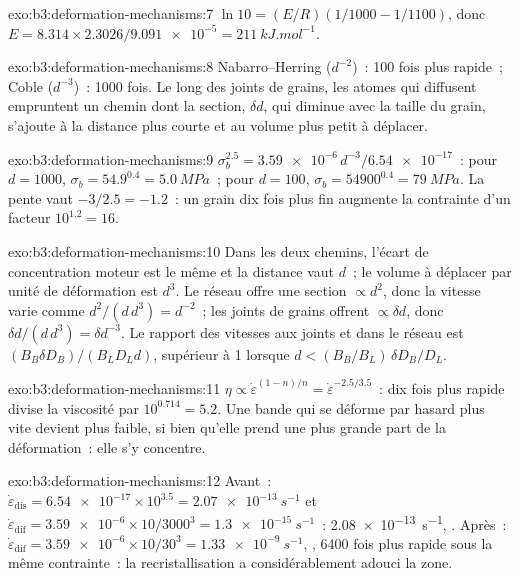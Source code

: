 \begin{solution}{exo:b3:deformation-mechanisms:7}
$\ln10 = (E/R)(1/1000 - 1/1100)$, donc $E = 8.314\times2.3026/\num{9.091e-5} =
\qty{211}{kJ.mol^{-1}}$.
\end{solution}

\begin{solution}{exo:b3:deformation-mechanisms:8}
Nabarro--Herring ($d^{-2}$)~: 100 fois plus rapide~; Coble ($d^{-3}$)~: 1000 fois.
Le long des joints de grains, les atomes qui diffusent empruntent un chemin dont la section, $\delta
d$, qui diminue avec la taille du grain, s'ajoute à la distance plus courte et au
volume plus petit à déplacer.
\end{solution}

\begin{solution}{exo:b3:deformation-mechanisms:9}
$\sigma_b^{2.5} = \num{3.59e-6}\,d^{-3}/\num{6.54e-17}$~: pour $d = 1000$,
$\sigma_b = 54.9^{0.4} = \qty{5.0}{MPa}$~; pour $d = 100$, $\sigma_b =
\num{54900}^{0.4} = \qty{79}{MPa}$. La pente vaut $-3/2.5 = -1.2$~: un grain
dix fois plus fin augmente la contrainte d'un facteur $10^{1.2} = 16$.
\end{solution}

\begin{solution}{exo:b3:deformation-mechanisms:10}
Dans les deux chemins, l'écart de concentration moteur est le même et la
distance vaut $d$~; le volume à déplacer par unité de déformation est $d^3$. Le réseau
offre une section $\propto d^2$, donc la vitesse varie comme $d^2/(d\,d^3) =
d^{-2}$~; les joints de grains offrent $\propto\delta d$, donc $\delta d/(d\,d^3) = \delta
d^{-3}$. Le rapport des vitesses aux joints et dans le réseau est $(B_B\delta D_B)/(B_LD_Ld)$,
supérieur à 1 lorsque $d < (B_B/B_L)\,\delta D_B/D_L$.
\end{solution}

\begin{solution}{exo:b3:deformation-mechanisms:11}
$\eta \propto \dot\varepsilon^{(1-n)/n} = \dot\varepsilon^{-2.5/3.5}$~: dix fois
plus rapide divise la viscosité par $10^{0.714} = 5.2$. Une bande qui se déforme
par hasard plus vite devient plus faible, si bien qu'elle prend une plus grande part de la
déformation~: elle s'y concentre.
\end{solution}

\begin{solution}{exo:b3:deformation-mechanisms:12}
Avant~: $\dot\varepsilon_{\mathrm{dis}} = \num{6.54e-17}\times10^{3.5} =
\qty{2.07e-13}{s^{-1}}$ et $\dot\varepsilon_{\mathrm{dif}} = \num{3.59e-6}
\times10/3000^3 = \qty{1.3e-15}{s^{-1}}$~: \qty{2.08e-13}{s^{-1}}, . Après~: $\dot\varepsilon_{\mathrm{dif}} = \num{3.59e-6}\times10/30^3 =
\qty{1.33e-9}{s^{-1}}$, , \num{6400} fois plus rapide sous la même
contrainte~: la recristallisation a considérablement adouci la zone.
\end{solution}

